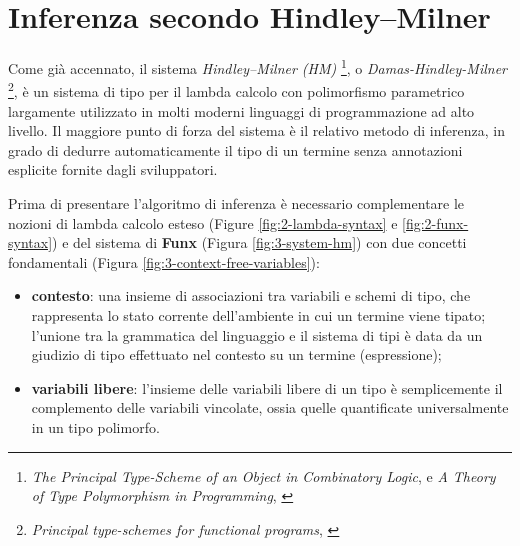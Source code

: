 \section{Inferenza secondo Hindley–Milner}
\label{sec:3-4-hm-type-inference}

Come già accennato, il sistema \textit{Hindley–Milner (HM)}%
\footnote{\textit{The Principal Type-Scheme of an Object in Combinatory Logic}, \cite{PrincipalTypeSchemeObjectCombinatoryLogic}
    e \textit{A Theory of Type Polymorphism in Programming}, \cite{TheoryTypePolymorphismProgramming}},
o \textit{Damas-Hindley-Milner}%
\footnote{\textit{Principal type-schemes for functional programs}, \cite{PrincipalTypeSchemesFunctionalPrograms}},
è un sistema di tipo per il lambda calcolo con polimorfismo parametrico largamente utilizzato
in molti moderni linguaggi di programmazione ad alto livello. Il maggiore punto di forza del sistema
è il relativo metodo di inferenza, in grado di dedurre automaticamente il tipo di un termine
senza annotazioni esplicite fornite dagli sviluppatori.


Prima di presentare l'algoritmo di inferenza è necessario complementare le nozioni di lambda calcolo esteso
(Figure \ref{fig:2-lambda-syntax} e \ref{fig:2-funx-syntax}) e del sistema di \textbf{Funx} (Figura \ref{fig:3-system-hm})
con due concetti fondamentali (Figura \ref{fig:3-context-free-variables}):
\begin{itemize}
    \item \textbf{contesto}: una insieme di associazioni tra variabili e schemi di tipo,
          che rappresenta lo stato corrente dell'ambiente in cui un termine viene tipato; l'unione tra la grammatica
          del linguaggio e il sistema di tipi è data da un giudizio di tipo effettuato nel contesto su un termine (espressione);
    \item \textbf{variabili libere}: l'insieme delle variabili libere di un tipo è semplicemente il complemento
          delle variabili vincolate, ossia quelle quantificate universalmente in un tipo polimorfo.
\end{itemize}

